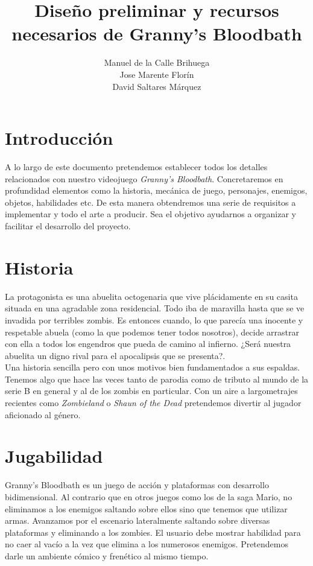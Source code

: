 \documentclass[titlepage]{article}
\author{Manuel de la Calle Brihuega\\Jose Marente Florín\\David Saltares Márquez}
\title{Diseño preliminar y recursos necesarios de Granny's Bloodbath}
\begin{document}
\maketitle

\clearpage

\tableofcontents

\clearpage

\section{Introducción}
A lo largo de este documento pretendemos establecer todos los detalles relacionados con nuestro videojuego \emph{Granny's Bloodbath}. Concretaremos en profundidad elementos como la historia, mecánica de juego, personajes, enemigos, objetos, habilidades etc. De esta manera obtendremos una serie de requisitos a implementar y todo el arte a producir. Sea el objetivo ayudarnos a organizar y facilitar el desarrollo del proyecto.\\

\section{Historia}
La protagonista es una abuelita octogenaria que vive plácidamente en su casita situada en una agradable zona residencial. Todo iba de maravilla hasta que se ve invadida por terribles zombis. Es entonces cuando, lo que parecía una inocente y respetable abuela (como la que podemos tener todos nosotros), decide arrastrar con ella a todos los engendros que pueda de camino al infierno. ¿Será nuestra abuelita un digno rival para el apocalipsis que se presenta?.\\

Una historia sencilla pero con unos motivos bien fundamentados a sus espaldas. Tenemos algo que hace las veces tanto de parodia como de tributo al mundo de la serie B en general y al de los zombis en particular. Con un aire a largometrajes recientes como \emph{Zombieland} o \emph{Shaun of the Dead} pretendemos divertir al jugador aficionado al género.

\section{Jugabilidad}
Granny's Bloodbath es un juego de acción y plataformas con desarrollo bidimensional. Al contrario que en otros juegos como los de la saga Mario, no eliminamos a los enemigos saltando sobre ellos sino que tenemos que utilizar armas. Avanzamos por el escenario lateralmente saltando sobre diversas plataformas y eliminando a los zombies. El usuario debe mostrar habilidad para no caer al vacío a la vez que elimina a los numerosos enemigos. Pretendemos darle un ambiente cómico y frenético al mismo tiempo.\\
\end{document}
